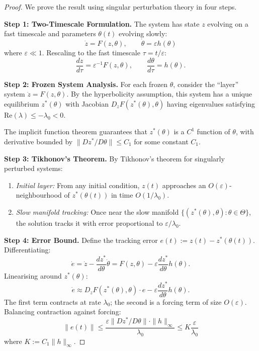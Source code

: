 \documentclass[12pt]{article}
\begin{document}
\begin{proof}
We prove the result using singular perturbation theory in four steps.

\textbf{Step 1: Two-Timescale Formulation.}
The system has state $z$ evolving on a fast timescale and parameters $\theta(t)$ evolving slowly:
\[
\dot{z} = F(z, \theta), \qquad \dot{\theta} = \varepsilon h(\theta)
\]
where $\varepsilon \ll 1$. Rescaling to the fast timescale $\tau = t/\varepsilon$:
\[
\frac{dz}{d\tau} = \varepsilon^{-1} F(z, \theta), \qquad \frac{d\theta}{d\tau} = h(\theta).
\]

\textbf{Step 2: Frozen System Analysis.}
For each frozen $\theta$, consider the ``layer'' system $\dot{z} = F(z, \theta)$. By the hyperbolicity assumption, this system has a unique equilibrium $z^*(\theta)$ with Jacobian $D_z F(z^*(\theta), \theta)$ having eigenvalues satisfying $\text{Re}(\lambda) \leq -\lambda_0 < 0$.

The implicit function theorem guarantees that $z^*(\theta)$ is a $C^1$ function of $\theta$, with derivative bounded by $\|Dz^*/D\theta\| \leq C_1$ for some constant $C_1$.

\textbf{Step 3: Tikhonov's Theorem.}
By Tikhonov's theorem for singularly perturbed systems:
\begin{enumerate}
    \item \textit{Initial layer:} From any initial condition, $z(t)$ approaches an $O(\varepsilon)$-neighbourhood of $z^*(\theta(t))$ in time $O(1/\lambda_0)$.
    \item \textit{Slow manifold tracking:} Once near the slow manifold $\{(z^*(\theta), \theta) : \theta \in \Theta\}$, the solution tracks it with error proportional to $\varepsilon/\lambda_0$.
\end{enumerate}

\textbf{Step 4: Error Bound.}
Define the tracking error $e(t) := z(t) - z^*(\theta(t))$. Differentiating:
\[
\dot{e} = \dot{z} - \frac{dz^*}{d\theta} \dot{\theta} = F(z, \theta) - \varepsilon \frac{dz^*}{d\theta} h(\theta).
\]
Linearising around $z^*(\theta)$:
\[
\dot{e} \approx D_z F(z^*(\theta), \theta) \cdot e - \varepsilon \frac{dz^*}{d\theta} h(\theta).
\]
The first term contracts at rate $\lambda_0$; the second is a forcing term of size $O(\varepsilon)$. Balancing contraction against forcing:
\[
\|e(t)\| \leq \frac{\varepsilon \|Dz^*/D\theta\| \cdot \|h\|_\infty}{\lambda_0} \leq K \frac{\varepsilon}{\lambda_0}
\]
where $K := C_1 \|h\|_\infty$.
\end{proof}
\end{document}
